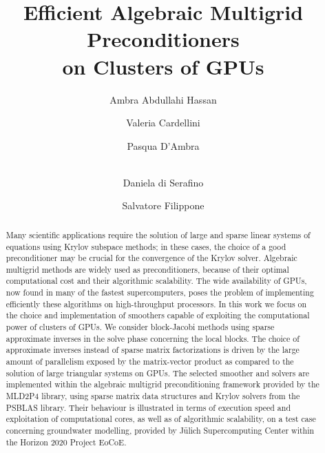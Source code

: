 \documentclass{llncs}
\begin{document}
\title{Efficient Algebraic Multigrid Preconditioners \\on Clusters of GPUs}
%
%
\author{Ambra Abdullahi Hassan%
\and Valeria Cardellini \and Pasqua D'Ambra \and \\ 
Daniela di Serafino \and  Salvatore Filippone}
%
%
\maketitle              %

\begin{abstract}
Many scientific applications require the solution of large and sparse linear systems of equations using Krylov
subspace methods; in these cases, the choice of a good preconditioner may be crucial for the convergence
of the Krylov solver. Algebraic multigrid methods are widely used as preconditioners, because of their optimal
computational cost and their algorithmic scalability. The wide availability of GPUs, now found in many
of the fastest supercomputers, poses the problem of implementing efficiently these algorithms on
high-throughput processors. In this work we focus on the choice and implementation of smoothers capable
of exploiting the computational power of clusters of GPUs. We consider block-Jacobi methods using sparse
approximate inverses in the solve phase concerning the local blocks. The choice of approximate inverses 
instead of sparse matrix factorizations is driven by the large amount of parallelism exposed by the matrix-vector
product as compared to the solution of large triangular systems on GPUs. The selected smoother and solvers are
implemented within the algebraic multigrid preconditioning framework provided by the MLD2P4 library, using sparse
matrix data structures and Krylov solvers from the PSBLAS library. Their behaviour is illustrated
in terms of execution speed and exploitation of computational cores, as well as of algorithmic scalability,
on a test case concerning groundwater modelling, provided by J\"ulich Supercomputing Center within the
Horizon 2020 Project EoCoE.
\end{abstract}
%

%

%

%

%

%
%






\end{document}
